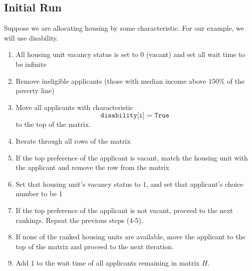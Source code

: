 \documentclass[11pt]{article}
\begin{document}
\subsection{Initial Run}
Suppose we are allocating housing by some characteristic. For our example, we will use disability.\\
\begin{enumerate}
    \item All housing unit vacancy status is set to 0 (vacant) and set all wait time to be infinite
    \item Remove ineligible applicants (those with median income above $150\%$ of the poverty line)
    \item Move all applicants with characteristic \[\texttt{disability[i] = True}\]
    to the top of the matrix.
    \item Iterate through all rows of the matrix
    \item If the top preference of the applicant is vacant, match the housing unit with the applicant and remove the row from the matrix
    \item Set that housing unit's vacancy status to 1, and set that applicant's choice number to be 1
    \item If the top preference of the applicant is not vacant, proceed to the next rankings. Repeat the previous steps (4-5).
    \item If none of the ranked housing units are available, move the applicant to the top of the matrix and proceed to the next iteration.
    \item Add 1 to the wait time of all applicants remaining in matrix $H$.
\end{enumerate}
\end{document}
